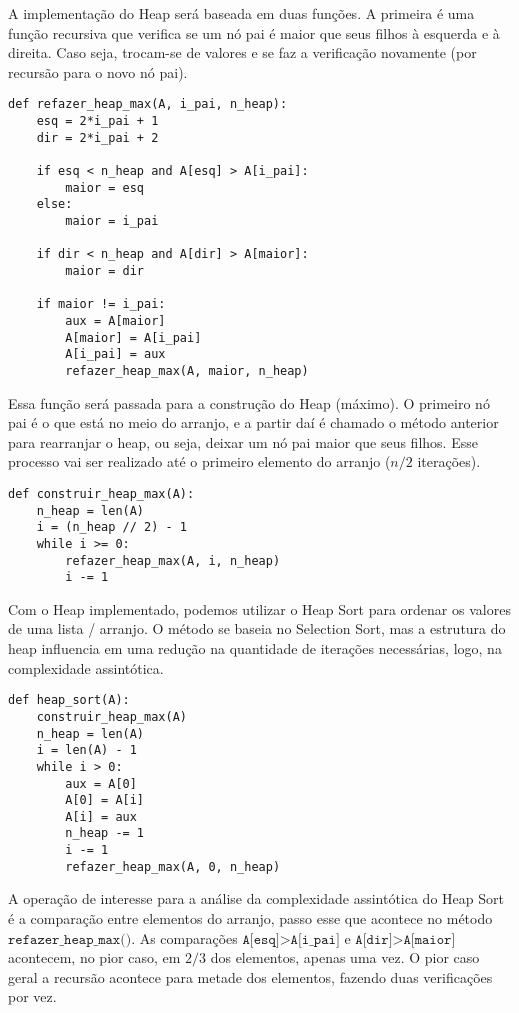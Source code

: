 \documentclass[a4paper, twocolumn]{article}
\theoremstyle{definition}
\begin{document}
A implementação do Heap será baseada em duas funções. A primeira é uma função recursiva que verifica se um nó pai é maior que seus filhos à esquerda e à direita. Caso seja, trocam-se de valores e se faz a verificação novamente (por recursão para o novo nó pai). 

\begin{lstlisting}[label=refazer_heap,caption= Manutenção do Heap]
def refazer_heap_max(A, i_pai, n_heap):
    esq = 2*i_pai + 1 
    dir = 2*i_pai + 2

    if esq < n_heap and A[esq] > A[i_pai]:
        maior = esq
    else:
        maior = i_pai
    
    if dir < n_heap and A[dir] > A[maior]:
        maior = dir
    
    if maior != i_pai:
        aux = A[maior]
        A[maior] = A[i_pai]
        A[i_pai] = aux
        refazer_heap_max(A, maior, n_heap)
\end{lstlisting}

Essa função será passada para a construção do Heap (máximo). O primeiro nó pai é o que está no meio do arranjo, e a partir daí é chamado o método anterior para rearranjar o heap, ou seja, deixar um nó pai maior que seus filhos. Esse processo vai ser realizado até o primeiro elemento do arranjo ($n/2$ iterações). 

\begin{lstlisting}[label=construir_heap,caption= Construção do Heap]
def construir_heap_max(A):
    n_heap = len(A)
    i = (n_heap // 2) - 1
    while i >= 0:
        refazer_heap_max(A, i, n_heap)
        i -= 1
\end{lstlisting}

Com o Heap implementado, podemos utilizar o Heap Sort para ordenar os valores de uma lista / arranjo. O método se baseia no Selection Sort, mas a estrutura do heap influencia em uma redução na quantidade de iterações necessárias, logo, na complexidade assintótica.

\begin{lstlisting}[label=heap_sort,caption= Heap Sort]
def heap_sort(A):
    construir_heap_max(A)
    n_heap = len(A)
    i = len(A) - 1
    while i > 0:
        aux = A[0]
        A[0] = A[i]
        A[i] = aux
        n_heap -= 1
        i -= 1
        refazer_heap_max(A, 0, n_heap)
\end{lstlisting}

A operação de interesse para a análise da complexidade assintótica do Heap Sort é a comparação entre elementos do arranjo, passo esse que acontece no método $\texttt{refazer\_heap\_max()}$. As comparações $\texttt{A[esq]>A[i\_pai]}$ e $\texttt{A[dir]>A[maior]}$ acontecem, no pior caso, em  $2/3$ dos elementos, apenas uma vez. O pior caso geral a recursão acontece para metade dos elementos, fazendo duas verificações por vez.\\
\end{document}

